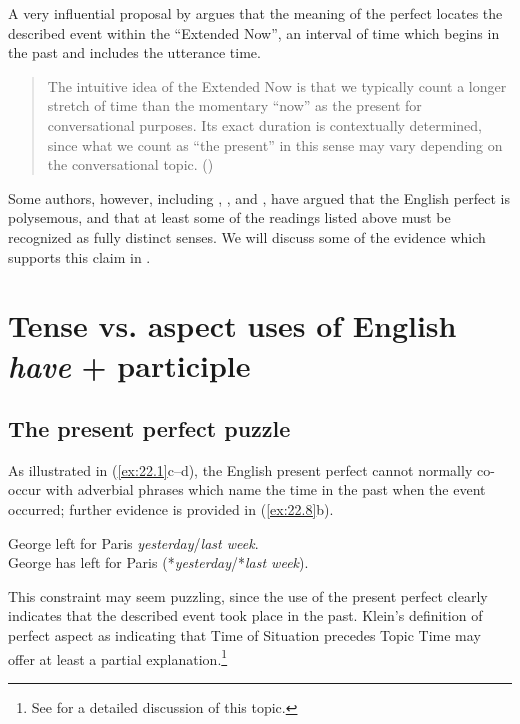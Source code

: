 A very influential proposal by \citet{McCoard1978} argues that the meaning of the perfect locates the described event within the “Extended Now”, an interval of time which begins in the past and includes the utterance time.


\begin{quote}
The intuitive idea of the Extended Now is that we typically count a longer stretch of time than the momentary “now” as the present for conversational purposes. Its exact duration is contextually determined, since what we count as “the present” in this sense may vary depending on the conversational topic. (\citealt{Portner2003}) 
\end{quote}


Some authors, however, including \citet{McCawley1971,McCawley1981b}, \citet{Michaelis1994,Michaelis1998}, and \citet{Kiparsky2002}, have argued that the English perfect is polysemous, and that at least some of the readings listed above must be recognized as fully distinct senses. We will discuss some of the evidence which supports this claim in .

\largerpage[2]
\section{Tense vs. aspect uses of English \textit{have} + participle}\label{sec:22.3}
\subsection{The present perfect puzzle}
\label{sec:22.3.1}


As illustrated in (\ref{ex:22.1}c--d), the English present perfect cannot normally co-occur with adverbial phrases which name the time in the past when the event occurred; further evidence is provided in (\ref{ex:22.8}b).


\ea \label{ex:22.8}
\ea George left for Paris {\textit{yesterday}/\textit{last week}}.\\
\ex George has left for Paris ({*\textit{yesterday}/*\textit{last week}}).
                       \z
\z


This constraint may seem puzzling, since the use of the present perfect clearly indicates that the described event took place in the past. Klein’s definition of perfect aspect as indicating that Time of Situation precedes Topic Time may offer at least a partial explanation.\footnote{See \citet{Klein1992} for a detailed discussion of this topic.}



